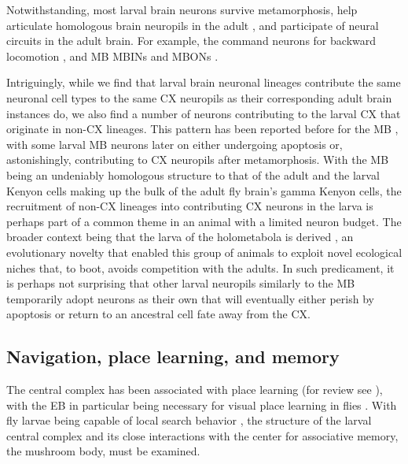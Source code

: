 Notwithstanding, most larval brain neurons survive metamorphosis, help articulate homologous brain neuropils in the adult \citep{prieto2012embryonic}, and participate of neural circuits in the adult brain. For example, the command neurons for backward locomotion \citep{carreira2018mdn}, and MB MBINs and MBONs \citep{truman2023metamorphosis}.

Intriguingly, while we find that larval brain neuronal lineages contribute the same neuronal cell types to the same CX neuropils as their corresponding adult brain instances do, we also find a number of neurons contributing to the larval CX that originate in non-CX lineages. This pattern has been reported before for the MB \citep{truman2023metamorphosis}, with some larval MB neurons later on either undergoing apoptosis or, astonishingly, contributing to CX neuropils after metamorphosis. With the MB being an undeniably homologous structure to that of the adult and the larval Kenyon cells making up the bulk of the adult fly brain's gamma Kenyon cells, the recruitment of non-CX lineages into contributing CX neurons in the larva is perhaps part of a common theme in an animal with a limited neuron budget. The broader context being that the larva of the holometabola is derived \citep{truman1999origins, truman2019evolution}, an evolutionary novelty that enabled this group of animals to exploit novel ecological niches that, to boot, avoids competition with the adults.
In such predicament, it is perhaps not surprising that other larval neuropils similarly to the MB temporarily adopt neurons as their own that will eventually either perish by apoptosis or return to an ancestral cell fate away from the CX.


\subsection{Navigation, place learning, and memory}

The central complex has been associated with place learning (for review see \citep{PfeifferHomberg2014}), with the EB in particular being necessary for visual place learning in flies \citep{ofstad2011visual}. With fly larvae being capable of local search behavior \citep{kromp2024localsearch}, the structure of the larval central complex and its close interactions with the center for associative memory, the mushroom body, must be examined.

